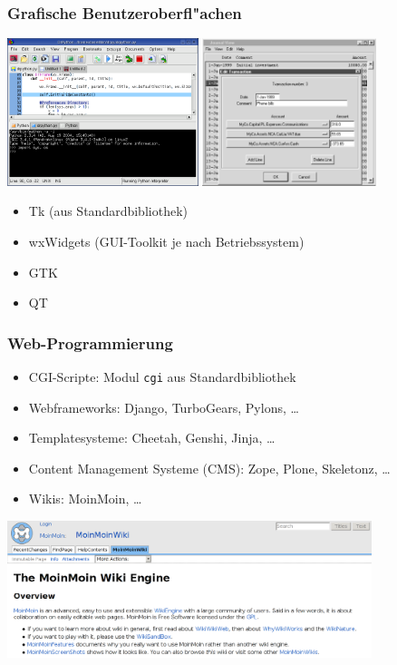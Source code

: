 \begin{frame}
\frametitle{Grafische Benutzeroberfl"achen}
\includegraphics[height=4.3cm]{images/drpython_screenshot.png}
\hspace*{2mm}
\includegraphics[height=4.3cm]{images/tkinter.png}

\begin{itemize}
\item Tk (aus Standardbibliothek)
\item wxWidgets (GUI-Toolkit je nach Betriebssystem)
\item GTK
\item QT
\end{itemize}
\end{frame}

\begin{frame}
\frametitle{Web-Programmierung}
\begin{itemize}
\item CGI-Scripte: Modul \texttt{cgi} aus  Standardbibliothek
\item Webframeworks: Django, TurboGears, Pylons, \dots
\item Templatesysteme: Cheetah, Genshi, Jinja, \dots
\item Content Management Systeme (CMS): Zope, Plone, Skeletonz, \dots
\item Wikis: MoinMoin, \dots
\end{itemize}

\includegraphics[height=4cm]{images/moinmoin.png}
\end{frame}

